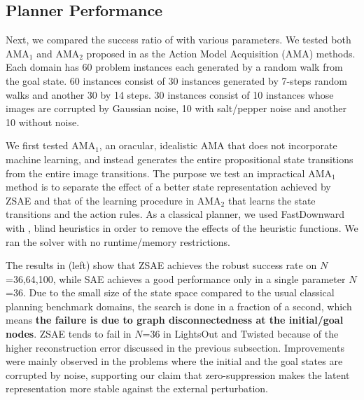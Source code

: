 \subsection{Planner Performance}

Next, we compared the success ratio of \latentplanner with various parameters.
We tested both AMA$_1$ and AMA$_2$ proposed in \cite{Asai2018} as the Action Model Acquisition (AMA) methods.
% 
Each domain has 60 problem instances each generated by a random walk from
the goal state. 60 instances consist of 30 instances generated by 7-steps random walks
and another 30 by 14 steps. 30 instances consist of 10 instances whose images are corrupted by Gaussian noise,
10 with salt/pepper noise and another 10 without noise.

We first tested AMA$_1$, an oracular, idealistic AMA that does not incorporate machine learning,
and instead generates the entire propositional state transitions from the entire image transitions.
The purpose we test an impractical AMA$_1$ method is
to separate the effect of a better state representation achieved by ZSAE
and that of the learning procedure in AMA$_2$ that learns the state transitions and the action rules.
As a classical planner, we used FastDownward \cite{Helmert04} with \astar, blind heuristics in order to
remove the effects of the heuristic functions. We ran the solver with no runtime/memory restrictions.

The results in  (left) show that ZSAE achieves the robust success rate on $N$=36,64,100,
while SAE achieves a good performance only in a single parameter $N$=36.
% 
Due to the small size of the state space compared to the usual classical planning benchmark domains,
the search is done in a fraction of a second, which means \textbf{the failure is due to graph disconnectedness at the initial/goal nodes}.
ZSAE tends to fail in $N$=36 in LightsOut and Twisted because of the higher reconstruction error
discussed in the previous subsection.
% 
Improvements were mainly observed in the problems where
the initial and the goal states are corrupted by noise, supporting our claim that
zero-suppression makes the latent representation more stable against the external perturbation.


